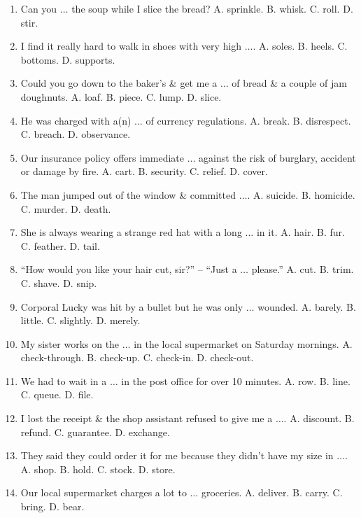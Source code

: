 \documentclass{article}
\numberwithin{equation}{section}
\begin{document}
\begin{enumerate}[leftmargin=2mm]
	\item Can you $\ldots$ the soup while I slice the bread? {\sf A.} sprinkle. {\sf B.} whisk. {\sf C.} roll. {\sf D.} stir.
	\item I find it really hard to walk in shoes with very high $\ldots$. {\sf A.} soles. {\sf B.} heels. {\sf C.} bottoms. {\sf D.} supports.
	\item Could you go down to the baker's \& get me a $\ldots$ of bread \& a couple of jam doughnuts. {\sf A.} loaf. {\sf B.} piece. {\sf C.} lump. {\sf D.} slice.
	\item He was charged with a(n) $\ldots$ of currency regulations. {\sf A.} break. {\sf B.} disrespect. {\sf C.} breach. {\sf D.} observance.
	\item Our insurance policy offers immediate $\ldots$ against the risk of burglary, accident or damage by fire. {\sf A.} cart. {\sf B.} security. {\sf C.} relief. {\sf D.} cover.
	\item The man jumped out of the window \& committed $\ldots$. {\sf A.} suicide. {\sf B.} homicide. {\sf C.} murder. {\sf D.} death.
	\item She is always wearing a strange red hat with a long $\ldots$ in it. {\sf A.} hair. {\sf B.} fur. {\sf C.} feather. {\sf D.} tail.
	\item ``How would you like your hair cut, sir?'' -- ``Just a $\ldots$ please.'' {\sf A.} cut. {\sf B.} trim. {\sf C.} shave. {\sf D.} snip.
	\item Corporal Lucky was hit by a bullet but he was only $\ldots$ wounded. {\sf A.} barely. {\sf B.} little. {\sf C.} slightly. {\sf D.} merely.
	\item My sister works on the $\ldots$ in the local supermarket on Saturday mornings. {\sf A.} check-through. {\sf B.} check-up. {\sf C.} check-in. {\sf D.} check-out.
	\item We had to wait in a $\ldots$ in the post office for over 10 minutes. {\sf A.} row. {\sf B.} line. {\sf C.} queue. {\sf D.} file.
	\item I lost the receipt \& the shop assistant refused to give me a $\ldots$. {\sf A.} discount. {\sf B.} refund. {\sf C.} guarantee. {\sf D.} exchange.
	\item They said they could order it for me because they didn't have my size in $\ldots$. {\sf A.} shop. {\sf B.} hold. {\sf C.} stock. {\sf D.} store.
	\item Our local supermarket charges a lot to $\ldots$ groceries. {\sf A.} deliver. {\sf B.} carry. {\sf C.} bring. {\sf D.} bear.

\end{enumerate}
\end{document}
